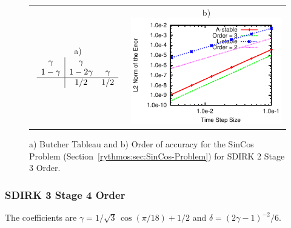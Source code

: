 \begin{figure}[H]
\centering{}%
\begin{tabular}{cc}
a) $\begin{array}{c|cc}
\gamma & \gamma\\
1-\gamma & 1-2\gamma & \gamma\\
\hline  & 1/2 & 1/2
\end{array}$ & b)\includegraphics[scale=1.5]{figures/SDIRK_2Stage3OrderLStable}\tabularnewline
\end{tabular}\caption{a) Butcher Tableau and b) Order of accuracy for the SinCos Problem
(Section~\ref{rythmos:sec:SinCos-Problem}) for SDIRK 2 Stage 3 Order.}
\end{figure}



\subsubsection{SDIRK 3 Stage 4 Order}

The coefficients are $\gamma=1/\sqrt{3}\,\cos(\pi/18)+1/2$ and $\delta=(2\gamma-1)^{-2}/6$.

